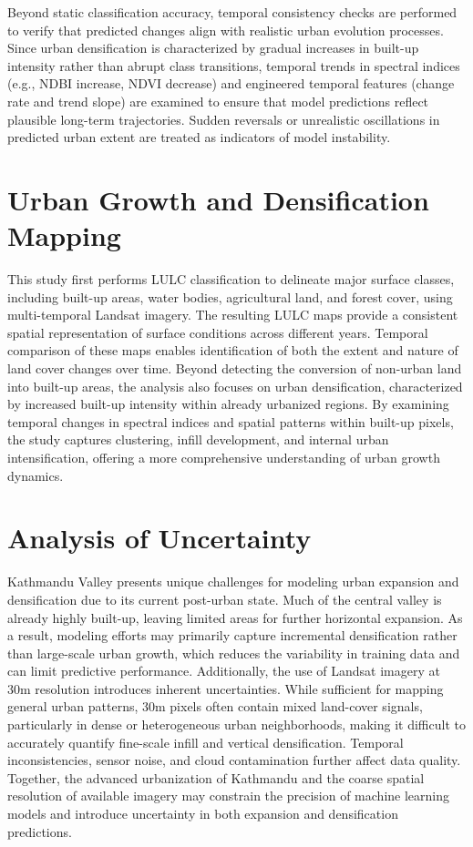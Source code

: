 \documentclass[main]{subfiles}
\begin{document}
Beyond static classification accuracy, temporal consistency checks are performed to verify that predicted changes align with realistic urban evolution processes. Since urban densification is characterized by gradual increases in built-up intensity rather than abrupt class transitions, temporal trends in spectral indices (e.g., NDBI increase, NDVI decrease) and engineered temporal features (change rate and trend slope) are examined to ensure that model predictions reflect plausible long-term trajectories. Sudden reversals or unrealistic oscillations in predicted urban extent are treated as indicators of model instability.


\section{Urban Growth and Densification Mapping}
This study first performs LULC classification to delineate major surface classes, including built-up areas, water bodies, agricultural land, and forest cover, using multi-temporal Landsat imagery. The resulting LULC maps provide a consistent spatial representation of surface conditions across different years. Temporal comparison of these maps enables identification of both the extent and nature of land cover changes over time. Beyond detecting the conversion of non-urban land into built-up areas, the analysis also focuses on urban densification, characterized by increased built-up intensity within already urbanized regions. By examining temporal changes in spectral indices and spatial patterns within built-up pixels, the study captures clustering, infill development, and internal urban intensification, offering a more comprehensive understanding of urban growth dynamics.

\section{Analysis of Uncertainty}

Kathmandu Valley presents unique challenges for modeling urban expansion and densification due to its current post-urban state. Much of the central valley is already highly built-up, leaving limited areas for further horizontal expansion. As a result, modeling efforts may primarily capture incremental densification rather than large-scale urban growth, which reduces the variability in training data and can limit predictive performance. Additionally, the use of Landsat imagery at 30m resolution introduces inherent uncertainties. While sufficient for mapping general urban patterns, 30m pixels often contain mixed land-cover signals, particularly in dense or heterogeneous urban neighborhoods, making it difficult to accurately quantify fine-scale infill and vertical densification. Temporal inconsistencies, sensor noise, and cloud contamination further affect data quality. Together, the advanced urbanization of Kathmandu and the coarse spatial resolution of available imagery may constrain the precision of machine learning models and introduce uncertainty in both expansion and densification predictions.
\end{document}
